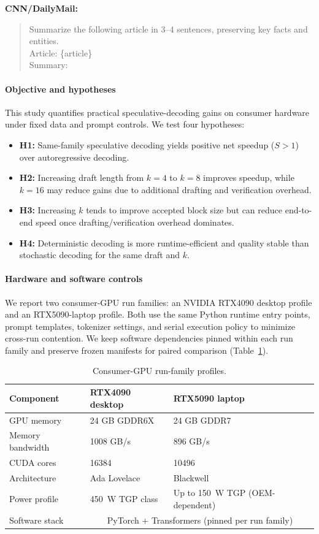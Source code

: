 \noindent\textbf{CNN/DailyMail:}
\begin{quote}\small
Summarize the following article in 3--4 sentences, preserving key facts and entities.\\
Article: \{article\}\\
Summary:
\end{quote}
\paragraph{Objective and hypotheses}
This study quantifies practical speculative-decoding gains on consumer hardware
under fixed data and prompt controls.
We test four hypotheses:
\begin{itemize}
    \item \textbf{H1:} Same-family speculative decoding yields positive net speedup
        ($S>1$) over autoregressive decoding.
    \item \textbf{H2:} Increasing draft length from $k{=}4$ to $k{=}8$ improves
        speedup, while $k{=}16$ may reduce gains due to additional drafting
        and verification overhead.
    \item \textbf{H3:} Increasing $k$ tends to improve accepted block size but can
        reduce end-to-end speed once drafting/verification overhead dominates.
    \item \textbf{H4:} Deterministic decoding is more runtime-efficient and quality
        stable than stochastic decoding for the same draft and $k$.
\end{itemize}

\paragraph{Hardware and software controls}
We report two consumer-GPU run families:
an NVIDIA RTX4090 desktop profile and an RTX5090-laptop profile.
Both use the same Python runtime entry points, prompt templates,
tokenizer settings, and serial execution policy to minimize cross-run
contention. We keep software dependencies pinned within each run family and
preserve frozen manifests for paired comparison (Table~\ref{tab:hw-profile}).

\begin{table}[t]
\centering
\caption{Consumer-GPU run-family profiles.}
\label{tab:hw-profile}
\small
\begin{tabular}{lll}
\hline
\textbf{Component} & \textbf{RTX4090 desktop} & \textbf{RTX5090 laptop} \\
\hline
GPU memory & 24 GB GDDR6X & 24 GB GDDR7 \\
Memory bandwidth & 1008 GB/s & 896 GB/s \\
CUDA cores & 16384 & 10496 \\
Architecture & Ada Lovelace & Blackwell \\
Power profile & 450~W TGP class & Up to 150~W TGP (OEM-dependent) \\
Software stack & \multicolumn{2}{c}{PyTorch + Transformers (pinned per run family)} \\
\hline
\end{tabular}
\end{table}

